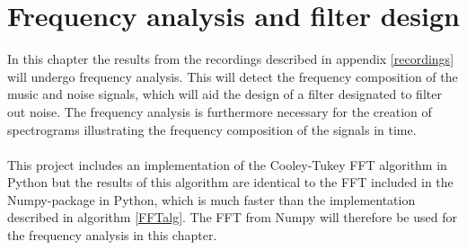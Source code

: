 \chapter{Frequency analysis and filter design} \label{ch9}
In this chapter the results from the recordings described in appendix \ref{recordings} will undergo frequency analysis. This will detect the frequency composition of the music and noise signals, which will aid the design of a filter designated to filter out noise. The frequency analysis is furthermore necessary for the creation of spectrograms illustrating the frequency composition of the signals in time. \\ \\
This project includes an implementation of the Cooley-Tukey FFT algorithm in Python but the results of this algorithm are identical to the FFT included in the Numpy-package in Python, which is much faster than the implementation described in algorithm \ref{FFTalg}. The FFT from Numpy will therefore be used for the frequency analysis in this chapter.



